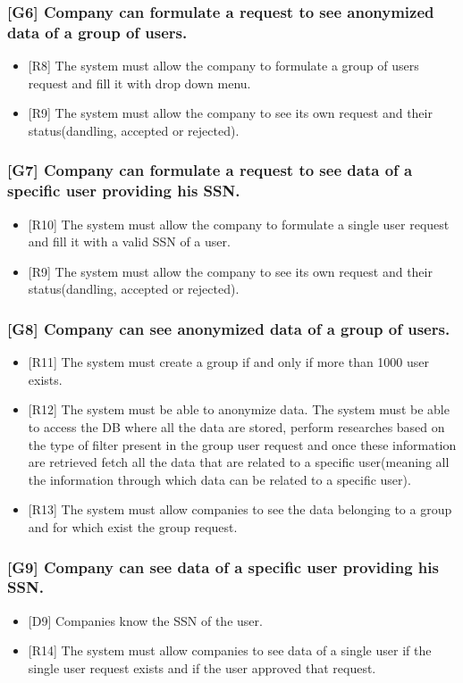 \documentclass{article}
\begin{document}
\subsubsection{[G6] Company can formulate a request to see anonymized data of a group of users.}
\begin{itemize}
\item {[R8]} The system must allow the company to formulate a group of users request and fill it with drop down menu.
\item {[R9]} The system must allow the company to see its own request and their status(dandling, accepted or rejected).
\end{itemize}
\subsubsection{[G7] Company can formulate a request to see data of a specific user providing his SSN.}
\begin{itemize}
\item {[R10]} The system must allow the company to formulate a single user request and fill it with a valid SSN of a user.
\item {[R9]} The system must allow the company to see its own request and their status(dandling, accepted or rejected).
\end{itemize}
\subsubsection{[G8] Company can see anonymized data of a group of users.}
\begin{itemize}
\item{[R11]} The system must create a group if and only if more than 1000 user exists. 
\item {[R12]} The system must be able to anonymize data. The system must be able to access the DB where all the data are stored, perform researches based on the type of filter present in the group user request and once these information are retrieved fetch all the data that are related to a specific user(meaning all the information through which data can be related to a specific user).
\item {[R13]} The system must allow companies to see the data belonging to a group and for which exist the group request.
\end{itemize}
\subsubsection{[G9] Company can see data of a specific user providing his SSN.}
\begin{itemize}
\item {[D9]} Companies know the SSN of the user.
\item {[R14]} The system must allow companies to see data of a single user if the single user request exists and if the user approved that request.
\end{itemize}
\end{document}
